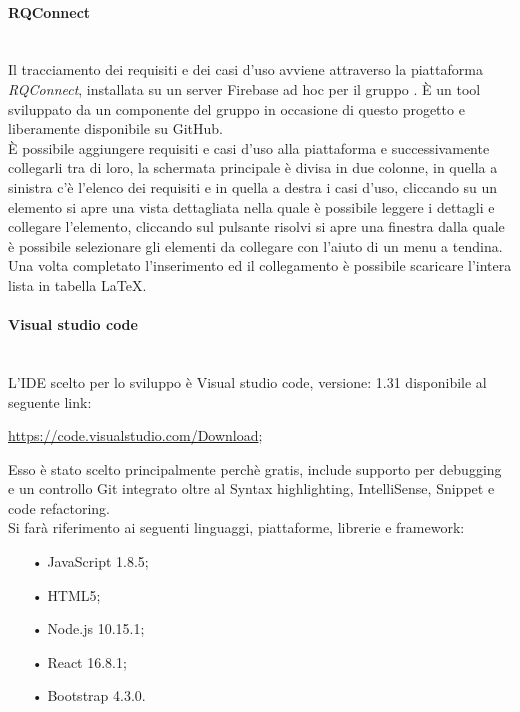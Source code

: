 \paragraph{RQConnect}\mbox{}\\ \label{sec:Trac}
Il tracciamento dei requisiti e dei casi d’uso avviene attraverso la piattaforma 
\textit{RQConnect}, installata su un server {Firebase} ad hoc per il gruppo \gruppo.
 È  un tool sviluppato da un componente del gruppo in occasione di questo progetto e 
 liberamente disponibile su GitHub.\\ È possibile aggiungere requisiti e casi d’uso 
 alla piattaforma e successivamente collegarli tra di loro, la schermata principale è 
 divisa in due colonne, in quella a sinistra c’è l’elenco dei requisiti e in quella a 
 destra i casi d’uso, cliccando su un elemento si apre una vista dettagliata nella quale 
 è possibile leggere i dettagli e collegare l’elemento, cliccando sul pulsante risolvi si 
 apre una finestra dalla quale è possibile selezionare gli elementi da collegare con l’aiuto 
 di un menu a tendina.\\Una volta completato l’inserimento ed il collegamento è possibile scaricare 
 l’intera lista in tabella \LaTeX.

\paragraph{Visual studio code}\mbox{}\\
L'{IDE} scelto per lo sviluppo è {Visual studio code}, versione: 1.31 disponibile al seguente link:\\
\begin{center}
	\url{https://code.visualstudio.com/Download};
\end{center}
Esso è stato scelto principalmente perchè gratis, include supporto per debugging e un controllo Git integrato oltre al {Syntax highlighting}, {IntelliSense}, {Snippet} e {code refactoring}.\\
Si farà riferimento ai seguenti linguaggi, piattaforme, librerie e framework:
\begin{itemize}
	\item[•]{JavaScript} 1.8.5;
	\item[•]{HTML5};
	\item[•]{Node.js} 10.15.1;
	\item[•]{React} 16.8.1;
	\item[•]{Bootstrap} 4.3.0.
\end{itemize}

